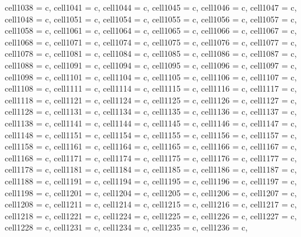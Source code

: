 {\begin{longtblr}[
  label = none,
  entry = none,
]
{  cell{103}{8} = {c},
  cell{104}{1} = {c},
  cell{104}{4} = {c},
  cell{104}{5} = {c},
  cell{104}{6} = {c},
  cell{104}{7} = {c},
  cell{104}{8} = {c},
  cell{105}{1} = {c},
  cell{105}{4} = {c},
  cell{105}{5} = {c},
  cell{105}{6} = {c},
  cell{105}{7} = {c},
  cell{105}{8} = {c},
  cell{106}{1} = {c},
  cell{106}{4} = {c},
  cell{106}{5} = {c},
  cell{106}{6} = {c},
  cell{106}{7} = {c},
  cell{106}{8} = {c},
  cell{107}{1} = {c},
  cell{107}{4} = {c},
  cell{107}{5} = {c},
  cell{107}{6} = {c},
  cell{107}{7} = {c},
  cell{107}{8} = {c},
  cell{108}{1} = {c},
  cell{108}{4} = {c},
  cell{108}{5} = {c},
  cell{108}{6} = {c},
  cell{108}{7} = {c},
  cell{108}{8} = {c},
  cell{109}{1} = {c},
  cell{109}{4} = {c},
  cell{109}{5} = {c},
  cell{109}{6} = {c},
  cell{109}{7} = {c},
  cell{109}{8} = {c},
  cell{110}{1} = {c},
  cell{110}{4} = {c},
  cell{110}{5} = {c},
  cell{110}{6} = {c},
  cell{110}{7} = {c},
  cell{110}{8} = {c},
  cell{111}{1} = {c},
  cell{111}{4} = {c},
  cell{111}{5} = {c},
  cell{111}{6} = {c},
  cell{111}{7} = {c},
  cell{111}{8} = {c},
  cell{112}{1} = {c},
  cell{112}{4} = {c},
  cell{112}{5} = {c},
  cell{112}{6} = {c},
  cell{112}{7} = {c},
  cell{112}{8} = {c},
  cell{113}{1} = {c},
  cell{113}{4} = {c},
  cell{113}{5} = {c},
  cell{113}{6} = {c},
  cell{113}{7} = {c},
  cell{113}{8} = {c},
  cell{114}{1} = {c},
  cell{114}{4} = {c},
  cell{114}{5} = {c},
  cell{114}{6} = {c},
  cell{114}{7} = {c},
  cell{114}{8} = {c},
  cell{115}{1} = {c},
  cell{115}{4} = {c},
  cell{115}{5} = {c},
  cell{115}{6} = {c},
  cell{115}{7} = {c},
  cell{115}{8} = {c},
  cell{116}{1} = {c},
  cell{116}{4} = {c},
  cell{116}{5} = {c},
  cell{116}{6} = {c},
  cell{116}{7} = {c},
  cell{116}{8} = {c},
  cell{117}{1} = {c},
  cell{117}{4} = {c},
  cell{117}{5} = {c},
  cell{117}{6} = {c},
  cell{117}{7} = {c},
  cell{117}{8} = {c},
  cell{118}{1} = {c},
  cell{118}{4} = {c},
  cell{118}{5} = {c},
  cell{118}{6} = {c},
  cell{118}{7} = {c},
  cell{118}{8} = {c},
  cell{119}{1} = {c},
  cell{119}{4} = {c},
  cell{119}{5} = {c},
  cell{119}{6} = {c},
  cell{119}{7} = {c},
  cell{119}{8} = {c},
  cell{120}{1} = {c},
  cell{120}{4} = {c},
  cell{120}{5} = {c},
  cell{120}{6} = {c},
  cell{120}{7} = {c},
  cell{120}{8} = {c},
  cell{121}{1} = {c},
  cell{121}{4} = {c},
  cell{121}{5} = {c},
  cell{121}{6} = {c},
  cell{121}{7} = {c},
  cell{121}{8} = {c},
  cell{122}{1} = {c},
  cell{122}{4} = {c},
  cell{122}{5} = {c},
  cell{122}{6} = {c},
  cell{122}{7} = {c},
  cell{122}{8} = {c},
  cell{123}{1} = {c},
  cell{123}{4} = {c},
  cell{123}{5} = {c},
  cell{123}{6} = {c},
}
\end{longtblr}}
